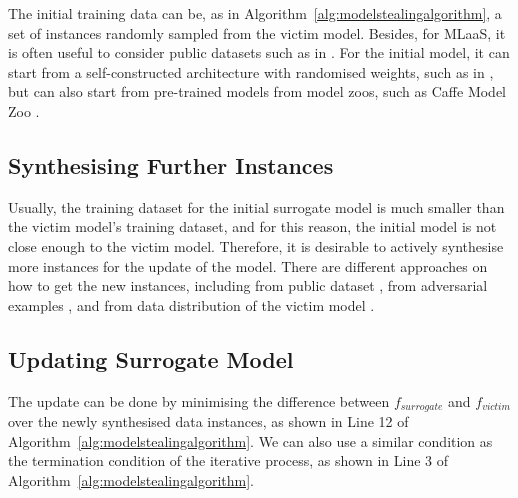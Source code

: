 The initial training data can be, as in Algorithm~\ref{alg:modelstealingalgorithm}, a set of instances randomly sampled from the victim model. Besides, for MLaaS, it is often useful to consider public datasets such as in \cite{DBLP:conf/cvpr/OrekondySF19,DBLP:conf/aaai/PalGSKSG20}. 
For the initial model, it can start from a self-constructed architecture with randomised weights, such as in \cite{practical-black-box}, but can also start from pre-trained models from model zoos, such as Caffe Model Zoo \cite{jia2014caffe}. 

\subsection*{Synthesising Further Instances}

Usually, the training dataset for the initial surrogate model is much smaller than the victim model's training dataset, and for this reason, the initial model is not close enough to the victim model. Therefore, it is desirable to actively synthesise more instances for the update of the model. There are different approaches on how to get the new instances, including from public dataset \cite{DBLP:conf/cvpr/OrekondySF19,DBLP:conf/aaai/PalGSKSG20}, from adversarial examples \cite{practical-black-box,DBLP:conf/ndss/YuYZTHJ20}, and from data distribution of the victim model \cite{DBLP:conf/ijcai/GongCYMW21}. 


\subsection*{Updating Surrogate Model}

The update can be done by minimising the difference between $f_{surrogate}$ and $f_{victim}$ over the newly synthesised data instances, as shown in Line 12 of Algorithm~\ref{alg:modelstealingalgorithm}. We can also use a similar condition as the termination condition of the iterative process, as shown in Line 3 of Algorithm~\ref{alg:modelstealingalgorithm}. 

